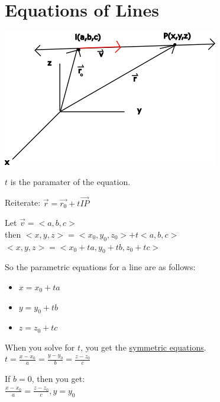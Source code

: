 \documentclass[12pt]{article}
\begin{document}
\section{Equations of Lines} 

\includegraphics{line3d}

$t$ is the paramater of the equation.

Reiterate: $\vec{r} = \vec{r_0} +t \vec{IP} $

Let $\vec{v}=<a,b,c> $\\%
then $<x,y,z>=<x_0,y_0,z_0> + t<a,b,c>$\\%
$<x,y,z>=<x_0+ta,y_0+tb, z_0+tc>$

So the parametric equations for a line are as follows:
\begin{itemize}
	\item $x=x_0+ta$
	\item $y=y_0+tb$
	\item $z=z_0+tc$
\end{itemize}

When you solve for $t$, you get the \underline{symmetric equations}.\\%
$t=\frac{x-x_0}{a}=\frac{y-y_0}{b}=\frac{z-z_0}{c}$

If $b=0$, then you get:\\%
$\frac{x-x_0}{a}=\frac{z-z_0}{c}, y=y_0$
\end{document}
